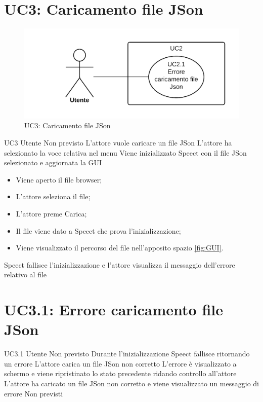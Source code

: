 \documentclass[../AnalisideiRequisiti.tex]{subfiles}
\begin{document}
	\section{UC3: Caricamento file JSon}
	\begin{figure}[H]
		\centering
		\includegraphics[width=\textwidth]{../img/UC3.png}
		\caption{UC3: Caricamento file JSon}
	\end{figure}
	\UserCase
	{UC3}
	{Utente}
	{Non previsto}
	{L'attore vuole caricare un file JSon}
	{L'attore ha selezionato la voce relativa nel menu }
	{Viene inizializzato Speect con il file JSon selezionato e aggiornata la GUI}
	{
		\begin{itemize}
			\item{} Viene aperto il file browser;
			\item{} L'attore seleziona il file;
			\item{} L'attore preme Carica;
			\item{} Il file viene dato a Speect che prova l'inizializzazione;
			\item{} Viene visualizzato il percorso del file nell'apposito spazio \ref{fig:GUI}.
		\end{itemize}
	}
	{Speect fallisce l'inizializzazione e l'attore visualizza il messaggio dell'errore relativo al file }
	
	\section{UC3.1: Errore caricamento file JSon}
	\UserCase
	{UC3.1}
	{Utente}
	{Non previsto}
	{Durante l'inizializzazione Speect fallisce ritornando un errore}
	{L'attore carica un file JSon non corretto}
	{L'errore è visualizzato a schermo e viene ripristinato lo stato precedente ridando controllo all'attore}
	{L'attore ha caricato un file JSon non corretto e viene visualizzato un messaggio di errore}
	{Non previsti}
\end{document}

